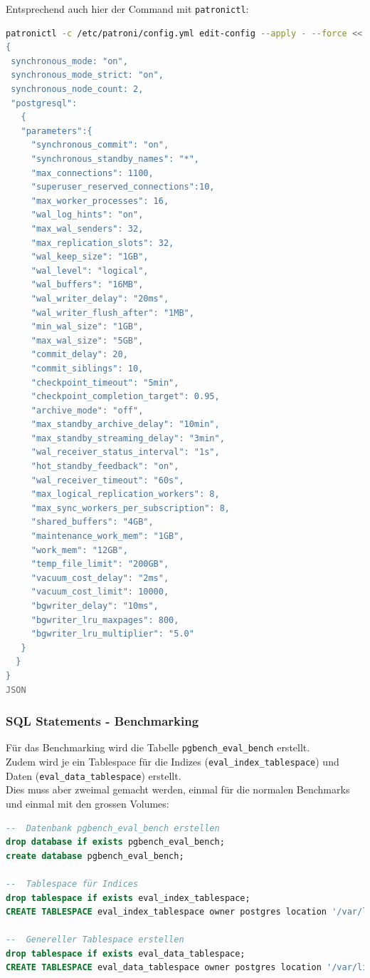 Entsprechend auch hier der Command mit \texttt{patronictl}:
\lstset{style=gra_codestyle}
\begin{lstlisting}[language=bash, caption=Patroni - 250GiB set Parameter,captionpos=b,label={lst:patroni_250gib_set_parameter},breaklines=true]
patronictl -c /etc/patroni/config.yml edit-config --apply - --force <<'JSON'
{
 synchronous_mode: "on",
 synchronous_mode_strict: "on",
 synchronous_node_count: 2,
 "postgresql":
   {
   "parameters":{
     "synchronous_commit": "on",
     "synchronous_standby_names": "*",
     "max_connections": 1100,
     "superuser_reserved_connections":10,
     "max_worker_processes": 16,
     "wal_log_hints": "on",
     "max_wal_senders": 32,
     "max_replication_slots": 32,
     "wal_keep_size": "1GB",
     "wal_level": "logical",
     "wal_buffers": "16MB",
     "wal_writer_delay": "20ms",
     "wal_writer_flush_after": "1MB",
     "min_wal_size": "1GB",
     "max_wal_size": "5GB",
     "commit_delay": 20,
     "commit_siblings": 10,
     "checkpoint_timeout": "5min",
     "checkpoint_completion_target": 0.95,
     "archive_mode": "off",
     "max_standby_archive_delay": "10min",
     "max_standby_streaming_delay": "3min",
     "wal_receiver_status_interval": "1s",
     "hot_standby_feedback": "on",
     "wal_receiver_timeout": "60s",
     "max_logical_replication_workers": 8,
     "max_sync_workers_per_subscription": 8,
     "shared_buffers": "4GB",
     "maintenance_work_mem": "1GB",
     "work_mem": "12GB",
     "temp_file_limit": "200GB",
     "vacuum_cost_delay": "2ms",
     "vacuum_cost_limit": 10000,
     "bgwriter_delay": "10ms",
     "bgwriter_lru_maxpages": 800,
     "bgwriter_lru_multiplier": "5.0"
   }
  }
}
JSON
\end{lstlisting}
\subsubsection{SQL Statements - Benchmarking}
\label{subsubsec:patroni_benchmarking_sql}
Für das Benchmarking wird die Tabelle \texttt{pgbench\_eval\_bench} erstellt.\\
Zudem wird je ein Tablespace für die Indizes (\texttt{eval\_index\_tablespace}) und Daten (\texttt{eval\_data\_tablespace}) erstellt.\\
Dies muss aber zweimal gemacht werden, einmal für die normalen Benchmarks und einmal mit den grossen Volumes:
\lstset{style=gra_codestyle}
\begin{lstlisting}[language=sql, caption=Patroni - Benchmarking - DB erstellen,captionpos=b,label={lst:patroni-benchmarking-create-db},breaklines=true]
--  Datenbank pgbench_eval_bench erstellen
drop database if exists pgbench_eval_bench;
create database pgbench_eval_bench;

--  Tablespace für Indices
drop tablespace if exists eval_index_tablespace;
CREATE TABLESPACE eval_index_tablespace owner postgres location '/var/lib/patroni/eval_index_tablespace';

--  Genereller Tablespace erstellen
drop tablespace if exists eval_data_tablespace;
CREATE TABLESPACE eval_data_tablespace owner postgres location '/var/lib/patroni/eval_data_tablespace';
\end{lstlisting}

